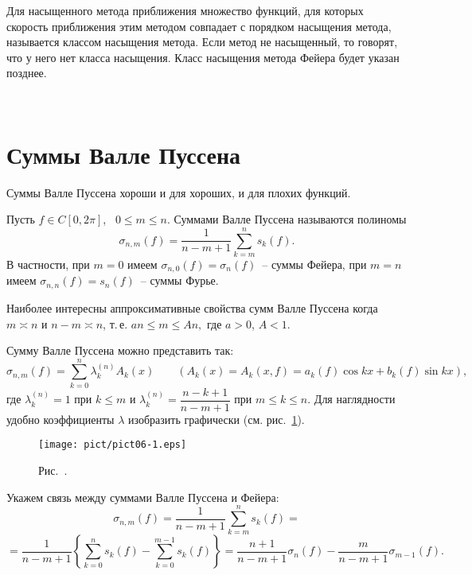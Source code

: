 {Для насыщенного метода приближения множество функций, для
которых скорость приближения этим методом совпадает с
порядком насыщения метода, называется классом насыщения
метода. Если метод не насыщенный, то говорят, что у него
нет класса насыщения. Класс насыщения метода Фейера будет
указан позднее.

\ \

\section{Суммы Валле Пуссена}

Суммы Валле Пуссена хороши и для хороших, и для плохих функций.

Пусть {$f\in C[0,2\pi]$},~ $0\le m\le n$. Суммами Валле Пуссена называются
полиномы
$$
\sigma_{n,m}(f)=\frac{1}{n-m+1} \sum\limits_{k=m}^{n}s_k(f).
$$
В частности, при $m=0$ имеем $\sigma_{n,0}(f)=\sigma_n(f)$~-- суммы Фейера, при $m=n$
имеем $\sigma_{n,n}(f)=s_n(f)$~-- суммы Фурье.

Наиболее интересны аппроксимативные свойства сумм Валле Пуссена когда $m\asymp n$ и $n-m
\asymp n$, т.\,е. $an\le m\le An,$ где $a>0$, $A<1$.

Сумму Валле Пуссена можно представить так:
$$
\sigma_{n,m}(f)=\sum\limits_{k=0}^n \lambda_k^{(n)} A_k(x) \qquad
{(A_k(x)=A_k(x,f)=a_k(f)\cos kx+b_k(f)\sin kx),}
$$
где $\lambda_k^{(n)}=1$ при $k\le m$ и $\lambda_k^{(n)}=\dfrac{n-k+1}{n-m+1}$
при $m\le k\le n.$ Для наглядности удобно коэффициенты $\lambda$
изобразить графически {(см. рис.~\ref{r6-1})}.
\vspace{7mm}

\begin{figure}[ht]
\begin{center}
\texttt{[image: pict/pict06-1.eps]}
\end{center}
 \bigskip
 \label{r6-1}

 \centerline{Рис.~\theris. }
 \bigskip
\end{figure}
\vspace{3mm}   



Укажем связь между суммами Валле Пуссена и Фейера:
$$
\sigma_{n,m}(f)=\frac{1}{n-m+1}\sum\limits_{k=m}^n s_k(f)=
$$
$$
=\frac{1}{n-m+1} \left\{ \sum\limits_{k=0}^n s_k(f)-
\sum\limits_{k=0}^{m-1} s_k(f) \right\}
=\frac{n+1}{n-m+1}\sigma_n(f)- \frac{m}{n-m+1}\sigma_{m-1}(f).
$$

}
